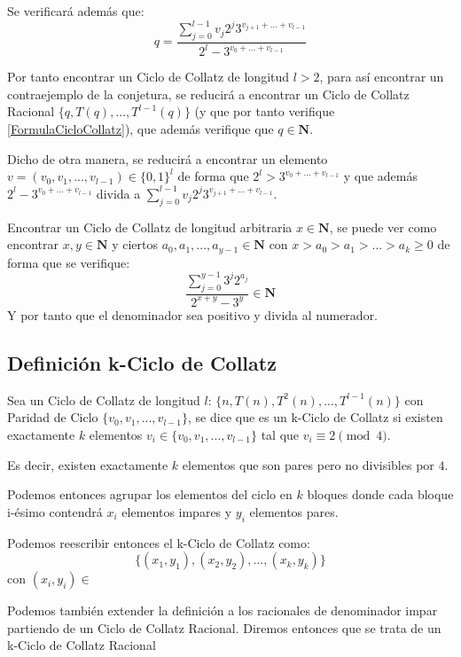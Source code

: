 Se verificará además que:
\begin{equation}
    \label{FormulaCicloCollatz}
    q=\frac{\sum\limits_{j=0}^{l-1} v_j 2^j 3^{v_{j+1}+ ... + v_{l-1}}}{2^l-3^{v_0+...+v_{l-1}}}
\end{equation}


Por tanto encontrar un Ciclo de Collatz de longitud $l>2$, para así encontrar un contraejemplo de la conjetura, se reducirá a encontrar un Ciclo de Collatz Racional $\{ q, T(q), ..., T^{l-1}(q)\}$ (y que por tanto verifique \ref{FormulaCicloCollatz}), que además verifique que $q\in \mathbf{N}$.

Dicho de otra manera, se reducirá a encontrar un elemento $v=(v_0, v_1, ..., v_{l-1}) \in \{0, 1\}^l$ de forma que $2^l > 3^{v_0 + ... + v_{l-1}}$ y que además $2^l - 3^{v_0 + ... + v_{l-1}}$ divida a $\sum\limits_{j=0}^{l-1} v_j 2^j 3^{v_{j+1}+ ... + v_{l-1}}$.

Encontrar un Ciclo de Collatz de longitud arbitraria $x\in\mathbf{N}$, se puede ver como encontrar $x, y \in \mathbf{N}$ y ciertos $a_0, a_1, ..., a_{y-1} \in \mathbf{N}$ con $x>a_0>a_1>...>a_k\geq0$ de forma que se verifique:
$$\frac{\sum\limits_{j=0}^{y-1}3^j2^{a_j}}{2^{x+y} - 3^y} \in \mathbf{N}$$
Y por tanto que el denominador sea positivo y divida al numerador.



\subsection{Definición k-Ciclo de Collatz}
Sea un Ciclo de Collatz de longitud $l$: $\{ n, T(n), T^2(n), ..., T^{l-1}(n)\}$ con Paridad de Ciclo $\{v_0, v_1, ..., v_{l-1}\}$, se dice que es un k-Ciclo de Collatz si existen exactamente $k$ elementos $v_i\in\{v_0, v_1, ..., v_{l-1}\}$ tal que $v_i \equiv 2 \pmod4$.

Es decir, existen exactamente $k$ elementos que son pares pero no divisibles por $4$.

Podemos entonces agrupar los elementos del ciclo en $k$ bloques donde cada bloque i-ésimo contendrá $x_i$ elementos impares y $y_i$ elementos pares.

Podemos reescribir entonces el k-Ciclo de Collatz como:
$$\{ (x_1,y_1),(x_2,y_2),...,(x_{k},y_{k}) \}$$
con $(x_i,y_i) \in $

Podemos también extender la definición a los racionales de denominador impar partiendo de un Ciclo de Collatz Racional. Diremos entonces que se trata de un k-Ciclo de Collatz Racional

